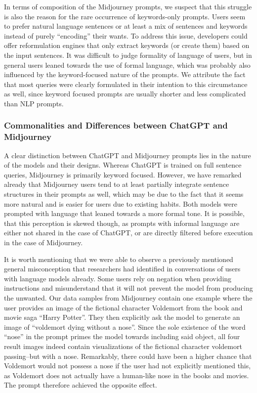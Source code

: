 In terms of composition of the Midjourney prompts, we suspect that this struggle is also the reason
for the rare occurrence of keywords-only prompts.
Users seem to prefer natural language sentences or at least a mix of sentences and keywords
instead of purely ``encoding'' their wants.
To address this issue, developers could offer reformulation engines that only extract keywords (or
create them) based on the input sentences.
It was difficult to judge formality of language of users, but in general users leaned towards the
use of formal language, which was probably also influenced by the keyword-focused nature of the prompts.
We attribute the fact that most queries were clearly formulated in their intention to this
circumstance as well,
since keyword focused prompts are usually shorter and less complicated than NLP prompts.

\subsubsection{Commonalities and Differences between ChatGPT and Midjourney}
A clear distinction between ChatGPT and Midjourney prompts lies in the nature of the models and
their designs.
Whereas ChatGPT is trained on full sentence queries, Midjourney is primarily keyword focused.
However, we have remarked already that Midjourney users tend to at least partially integrate
sentence structures in their prompts as well, which may be due to the fact that it seems more
natural and is easier for users due to existing habits.
Both models were prompted with language that leaned towards a more formal tone.
It is possible, that this perception is skewed though, as prompts with informal language are
either not shared in the case of ChatGPT, or are directly filtered before execution in the case
of Midjourney.

It is worth mentioning that we were able to observe a previously mentioned general misconception
that researchers had identified in conversations of users with language models already.
Some users rely on negation when providing instructions and misunderstand that it will not
prevent the model from producing the unwanted.
Our data samples from Midjourney contain one example where the user provides an image of the
fictional character Voldemort from the book and movie saga ``Harry Potter''.
They then explicitly ask the model to
generate an image of ``voldemort dying without a nose''.
Since the sole existence of the word ``nose'' in the prompt primes the model towards including said
object, all four result images indeed contain visualizations of the fictional character voldemort
passing--but with a nose.
Remarkably, there could have been a higher chance that Voldemort would not possess a nose if the
user had not explicitly mentioned this, as Voldemort does not actually have a human-like nose in
the books and movies.
The prompt therefore achieved the opposite effect.

